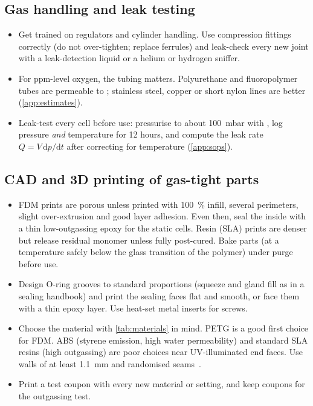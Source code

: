 \subsection{Gas handling and leak testing}
\begin{itemize}
  \item Get trained on regulators and cylinder handling. Use compression fittings correctly (do not
        over-tighten; replace ferrules) and leak-check every new joint with a leak-detection liquid or a
        helium or hydrogen sniffer.
  \item For ppm-level oxygen, the tubing matters. Polyurethane and fluoropolymer tubes are permeable
        to \Oxy; stainless steel, copper or short nylon lines are better (\cref{app:estimates}).
  \item Leak-test every cell before use: pressurise to about \SI{+100}{mbar} with \Ntwo, log pressure
        \emph{and} temperature for 12 hours, and compute the leak rate $Q=V\,\mathrm{d}p/\mathrm{d}t$ after
        correcting for temperature (\cref{app:sops}).
\end{itemize}

\subsection{CAD and 3D printing of gas-tight parts}
\begin{itemize}
  \item FDM prints are porous unless printed with \SI{100}{\percent} infill, several perimeters, slight
        over-extrusion and good layer adhesion. Even then, seal the inside with a thin low-outgassing epoxy
        for the static cells. Resin (SLA) prints are denser but release residual monomer unless fully
        post-cured. Bake parts (at a temperature safely below the glass transition of the polymer) under
        \Ntwo{} purge before use.
  \item Design O-ring grooves to standard proportions (squeeze and gland fill as in a sealing handbook)
        and print the sealing faces flat and smooth, or face them with a thin epoxy layer. Use heat-set
        metal inserts for screws.
  \item Choose the material with \cref{tab:materials} in mind. PETG is a good first choice for FDM. ABS
        (styrene emission, high water permeability) and standard SLA resins (high outgassing) are poor
        choices near UV-illuminated end faces. Use walls of at least \SI{1.1}{mm} and randomised
        seams~\cite{Gordeev2018}.
  \item Print a test coupon with every new material or setting, and keep coupons for the 
        outgassing test.
\end{itemize}

